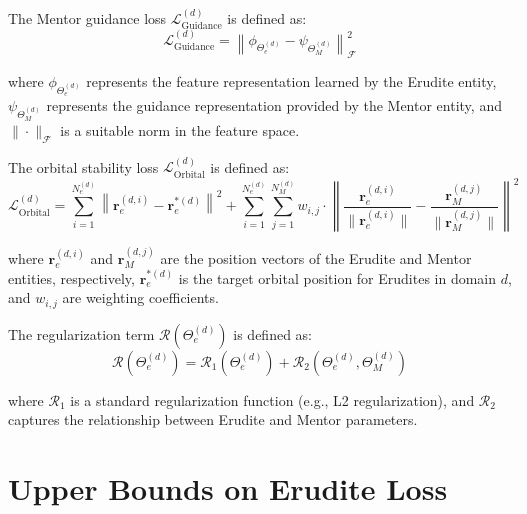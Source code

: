 \begin{definition}
The Mentor guidance loss $\mathcal{L}_{\text{Guidance}}^{(d)}$ is defined as:
\begin{equation}
\mathcal{L}_{\text{Guidance}}^{(d)} = \left\|\phi_{\Theta_e^{(d)}} - \psi_{\Theta_M^{(d)}}\right\|^2_{\mathcal{F}}
\end{equation}

where $\phi_{\Theta_e^{(d)}}$ represents the feature representation learned by the Erudite entity, $\psi_{\Theta_M^{(d)}}$ represents the guidance representation provided by the Mentor entity, and $\|\cdot\|_{\mathcal{F}}$ is a suitable norm in the feature space.
\end{definition}

\begin{definition}
The orbital stability loss $\mathcal{L}_{\text{Orbital}}^{(d)}$ is defined as:
\begin{equation}
\mathcal{L}_{\text{Orbital}}^{(d)} = \sum_{i=1}^{N_e^{(d)}} \left\|\mathbf{r}_e^{(d,i)} - \mathbf{r}_e^{*(d)}\right\|^2 + \sum_{i=1}^{N_e^{(d)}} \sum_{j=1}^{N_M^{(d)}} w_{i,j} \cdot \left\|\frac{\mathbf{r}_e^{(d,i)}}{\|\mathbf{r}_e^{(d,i)}\|} - \frac{\mathbf{r}_M^{(d,j)}}{\|\mathbf{r}_M^{(d,j)}\|}\right\|^2
\end{equation}

where $\mathbf{r}_e^{(d,i)}$ and $\mathbf{r}_M^{(d,j)}$ are the position vectors of the Erudite and Mentor entities, respectively, $\mathbf{r}_e^{*(d)}$ is the target orbital position for Erudites in domain $d$, and $w_{i,j}$ are weighting coefficients.
\end{definition}

\begin{definition}
The regularization term $\mathcal{R}(\Theta_e^{(d)})$ is defined as:
\begin{equation}
\mathcal{R}(\Theta_e^{(d)}) = \mathcal{R}_1(\Theta_e^{(d)}) + \mathcal{R}_2(\Theta_e^{(d)}, \Theta_M^{(d)})
\end{equation}

where $\mathcal{R}_1$ is a standard regularization function (e.g., L2 regularization), and $\mathcal{R}_2$ captures the relationship between Erudite and Mentor parameters.
\end{definition}

\section{Upper Bounds on Erudite Loss}

